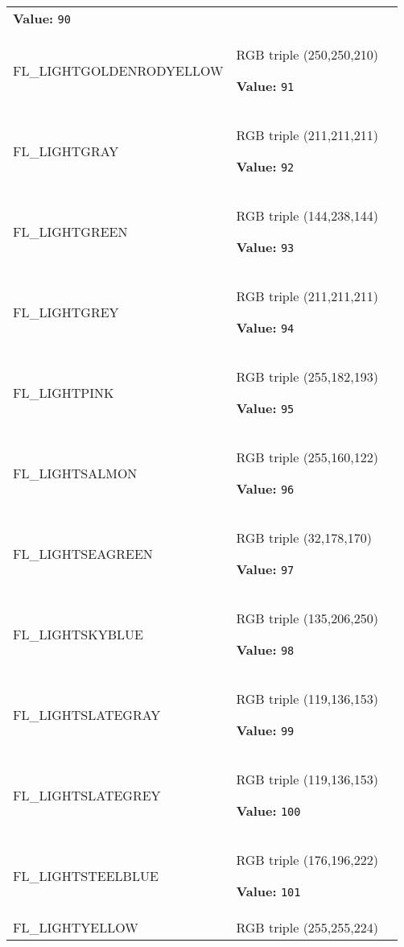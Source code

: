 \begin{longtable}{|p{\varnamewidth}|p{\vardescrwidth}|l}
\textbf{Value:} 
{\tt 90}&\\
\cline{1-2}
\raggedright F\-L\-\_\-L\-I\-G\-H\-T\-G\-O\-L\-D\-E\-N\-R\-O\-D\-Y\-E\-L\-L\-O\-W\- & \raggedright RGB triple (250,250,210)

\textbf{Value:} 
{\tt 91}&\\
\cline{1-2}
\raggedright F\-L\-\_\-L\-I\-G\-H\-T\-G\-R\-A\-Y\- & \raggedright RGB triple (211,211,211)

\textbf{Value:} 
{\tt 92}&\\
\cline{1-2}
\raggedright F\-L\-\_\-L\-I\-G\-H\-T\-G\-R\-E\-E\-N\- & \raggedright RGB triple (144,238,144)

\textbf{Value:} 
{\tt 93}&\\
\cline{1-2}
\raggedright F\-L\-\_\-L\-I\-G\-H\-T\-G\-R\-E\-Y\- & \raggedright RGB triple (211,211,211)

\textbf{Value:} 
{\tt 94}&\\
\cline{1-2}
\raggedright F\-L\-\_\-L\-I\-G\-H\-T\-P\-I\-N\-K\- & \raggedright RGB triple (255,182,193)

\textbf{Value:} 
{\tt 95}&\\
\cline{1-2}
\raggedright F\-L\-\_\-L\-I\-G\-H\-T\-S\-A\-L\-M\-O\-N\- & \raggedright RGB triple (255,160,122)

\textbf{Value:} 
{\tt 96}&\\
\cline{1-2}
\raggedright F\-L\-\_\-L\-I\-G\-H\-T\-S\-E\-A\-G\-R\-E\-E\-N\- & \raggedright RGB triple (32,178,170)

\textbf{Value:} 
{\tt 97}&\\
\cline{1-2}
\raggedright F\-L\-\_\-L\-I\-G\-H\-T\-S\-K\-Y\-B\-L\-U\-E\- & \raggedright RGB triple (135,206,250)

\textbf{Value:} 
{\tt 98}&\\
\cline{1-2}
\raggedright F\-L\-\_\-L\-I\-G\-H\-T\-S\-L\-A\-T\-E\-G\-R\-A\-Y\- & \raggedright RGB triple (119,136,153)

\textbf{Value:} 
{\tt 99}&\\
\cline{1-2}
\raggedright F\-L\-\_\-L\-I\-G\-H\-T\-S\-L\-A\-T\-E\-G\-R\-E\-Y\- & \raggedright RGB triple (119,136,153)

\textbf{Value:} 
{\tt 100}&\\
\cline{1-2}
\raggedright F\-L\-\_\-L\-I\-G\-H\-T\-S\-T\-E\-E\-L\-B\-L\-U\-E\- & \raggedright RGB triple (176,196,222)

\textbf{Value:} 
{\tt 101}&\\
\cline{1-2}
\raggedright F\-L\-\_\-L\-I\-G\-H\-T\-Y\-E\-L\-L\-O\-W\- & \raggedright RGB triple (255,255,224)


\end{longtable}
